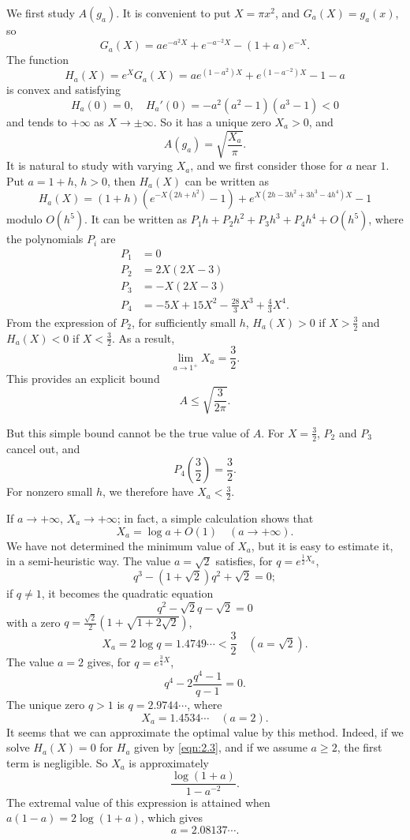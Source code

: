 We first study $A(g_{a})$.
It is convenient to put $X = \pi x^2$, and $G_{a}(X) = g_{a}(x)$, so
\[
    G_{a}(X) = a e^{-a^{2}X} + e^{-a^{-2}X} - (1 + a)e^{-X}.
\]
The function
\begin{equation}
    \label{eqn:2.3}
    H_{a}(X) = e^{X} G_{a}(X) = a e^{(1 - a^{2})X} + e^{(1 - a^{-2})X} - 1 - a
\end{equation}
is convex and satisfying
\[
    H_{a}(0) = 0, \quad H_{a}'(0) = -a^{2}(a^{2} - 1)(a^{3} - 1) < 0
\]
and tends to $+\infty$ as $X \to \pm \infty$.
So it has a unique zero $X_{a} > 0$, and
\[
    A(g_{a}) = \sqrt{\frac{X_{a}}{\pi}}.
\]
It is natural to study with varying $X_{a}$, and we first consider those for $a$ near $1$.
Put $a = 1 + h$, $h > 0$, then $H_{a}(X)$ can be written as
\[
    H_{a}(X) = (1 + h)(e^{-X(2h + h^2)} - 1) + e^{X(2h - 3h^{2} + 3h^{3} - 4h^{4})X} - 1
\]
modulo $O(h^{5})$.
It can be written as $P_{1}h + P_{2}h^{2} + P_{3}h^{3} + P_{4}h^{4} + O(h^{5})$, where the polynomials $P_{i}$ are
\begin{align*}
    P_{1} &= 0 \\
    P_{2} &= 2X(2X - 3)\\
    P_{3} &= -X(2X - 3) \\
    P_{4} &= -5X + 15 X^{2} - \frac{28}{3} X^{3} + \frac{4}{3}X^{4}.
\end{align*}
From the expression of $P_{2}$, for sufficiently small $h$, $H_a(X) > 0$ if $X > \frac{3}{2}$ and $H_a(X) < 0$ if $X < \frac{3}{2}$.
As a result,
\begin{equation}
    \label{eqn:2.4}
    \lim_{a \to 1^+} X_a = \frac{3}{2}.
\end{equation}
This provides an explicit bound
\begin{equation}
    \label{eqn:2.5}
    A \leq \sqrt{\frac{3}{2 \pi}}.
\end{equation}

But this simple bound cannot be the true value of $A$.
For $X = \frac{3}{2}$, $P_2$ and $P_3$ cancel out, and
\[
    P_4\left(\frac{3}{2}\right) = \frac{3}{2}.
\]
For nonzero small $h$, we therefore have $X_a < \frac{3}{2}$.

If $a \to +\infty$, $X_a \to +\infty$; in fact, a simple calculation shows that
\[
    X_a = \log a + O(1) \quad (a \to +\infty).
\]
We have not determined the minimum value of $X_a$, but it is easy to estimate it, in a semi-heuristic way.
The value $a = \sqrt{2}$ satisfies, for $q = e^{\frac{1}{2}X_a}$,
\[
    q^3 - (1+\sqrt{2})q^2 + \sqrt{2} = 0;
\]
if $q \neq 1$, it becomes the quadratic equation
\[
    q^2 - \sqrt{2} q - \sqrt{2} = 0
\]
with a zero $q = \frac{\sqrt{2}}{2}(1 + \sqrt{1+2\sqrt{2}})$,
\[
    X_a = 2 \log q = 1.4749\cdots < \frac{3}{2}\quad(a = \sqrt{2}).
\]
The value $a = 2$ gives, for $q = e^{\frac{3}{4}X}$,
\[
    q^4 - 2 \frac{q^4 - 1}{q - 1} = 0.
\]
The unique zero $q > 1$ is $q = 2.9744\cdots$, where
\[
    X_a = 1.4534\cdots\quad(a = 2).
\]
It seems that we can approximate the optimal value by this method.
Indeed, if we solve $H_a(X) = 0$ for $H_a$ given by \eqref{eqn:2.3}, and if we assume $a \geq 2$, the first term is negligible.
So $X_a$ is approximately
\[
    \frac{\log(1+a)}{1 - a^{-2}}.
\]
The extremal value of this expression is attained when $a(1-a) = 2 \log(1+a)$, which gives
\[
    a = 2.08137\cdots.
\]

